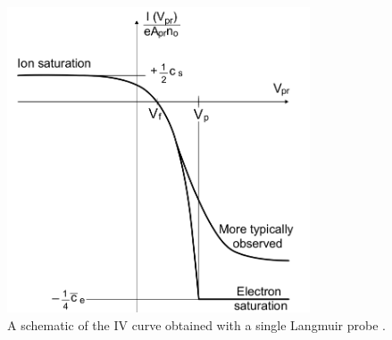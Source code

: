 \begin{figure}[H]
	\centering
	\includegraphics[width=0.8\textwidth]{monkiv}
	\caption{A schematic of the IV curve obtained with a single Langmuir probe \cite{monk}.}
	\label{fig:IV}
\end{figure}


